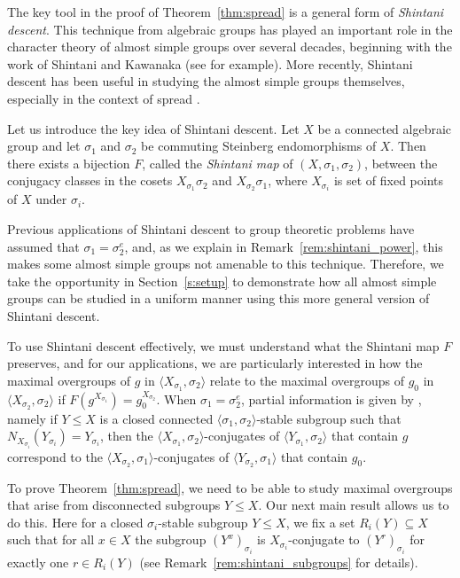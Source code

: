 \documentclass[11pt]{article}
\numberwithin{equation}{section}
\theoremstyle{shdefinition}
\theoremstyle{shplain}
\newcommand{\s}{\sigma}
\newcommand{\<}{\langle}
\renewcommand{\>}{\rangle}
\renewcommand{\leq}{\leqslant}
\renewcommand{\:}{\colon}
\begin{document}
The key tool in the proof of Theorem~\ref{thm:spread} is a general form of \emph{Shintani descent}. This technique from algebraic groups has played an important role in the character theory of almost simple groups over several decades, beginning with the work of Shintani and Kawanaka (see \cite{ref:CabanesSpath19,ref:Deshpande16,ref:DigneMichel94,ref:Kawanaka77,ref:Shintani76} for example). More recently, Shintani descent has been useful in studying the almost simple groups themselves, especially in the context of spread \cite{ref:BurnessGuest13,ref:BurnessGuralnickHarper,ref:Harper17,ref:Harper}.

Let us introduce the key idea of Shintani descent. Let $X$ be a connected algebraic group and let $\s_1$ and $\s_2$ be commuting Steinberg endomorphisms of $X$. Then there exists a bijection $F$, called the \emph{Shintani map} of $(X,\s_1,\s_2)$, between the conjugacy classes in the cosets $X_{\s_1}\s_2$ and $X_{\s_2}\s_1$, where $X_{\s_i}$ is set of fixed points of $X$ under $\s_i$. 

Previous applications of Shintani descent to group theoretic problems have assumed that $\s_1 = \s_2^e$, and, as we explain in Remark~\ref{rem:shintani_power}, this makes some almost simple groups not amenable to this technique. Therefore, we take the opportunity in Section~\ref{s:setup} to demonstrate how all almost simple groups can be studied in a uniform manner using this more general version of Shintani descent.

To use Shintani descent effectively, we must understand what the Shintani map $F$ preserves, and for our applications, we are particularly interested in how the maximal overgroups of $g$ in $\<X_{\s_1},\s_2\>$ relate to the maximal overgroups of $g_0$ in $\<X_{\s_2},\s_2\>$ if $F(g^{X_{\s_1}}) = g_0^{X_{\s_2}}$. When $\s_1=\s_2^e$, partial information is given by \cite[Lemma~3.3.2]{ref:Harper}, namely if $Y \leq X$ is a closed connected $\<\s_1,\s_2\>$-stable subgroup such that $N_{X_{\s_i}}(Y_{\s_i}) = Y_{\s_i}$, then the $\<X_{\s_1},\s_2\>$-conjugates of $\<Y_{\s_1},\s_2\>$ that contain $g$ correspond to the $\<X_{\s_2},\s_1\>$-conjugates of $\<Y_{\s_2},\s_1\>$ that contain $g_0$. 

To prove Theorem~\ref{thm:spread}, we need to be able to study maximal overgroups that arise from disconnected subgroups $Y \leq X$. Our next main result allows us to do this. Here for a closed $\s_i$-stable subgroup $Y \leq X$, we fix a set $R_i(Y) \subseteq X$ such that for all $x \in X$ the subgroup $(Y^x)_{\s_i}$ is $X_{\s_i}$-conjugate to $(Y^r)_{\s_i}$ for exactly one $r \in R_i(Y)$ (see Remark~\ref{rem:shintani_subgroups} for details).
\end{document}
